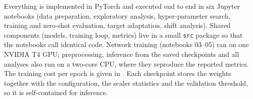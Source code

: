 Everything is implemented in PyTorch \parencite{paszke2019pytorch} and executed end to end in six
Jupyter notebooks (data preparation, exploratory analysis, hyper-parameter search, training and
zero-shot evaluation, target adaptation, shift analysis). Shared components (models, training loop,
metrics) live in a small \texttt{src} package so that the notebooks call identical code. Network
training (notebooks 03--05) ran on one NVIDIA T4 GPU; preprocessing, inference from the saved
checkpoints and all analyses also run on a two-core CPU, where they reproduce the reported metrics.
The training cost per epoch is given in .
Each checkpoint stores the weights together with the configuration, the scaler statistics and the
validation threshold, so it is self-contained for inference.
